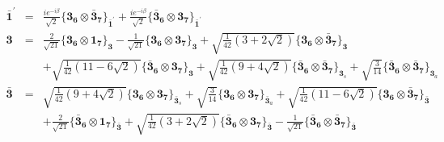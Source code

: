 \documentclass[english]{article}
\newcommand{\subcg}[3]{\big\{ {#1}\otimes{#2}\big\}^{}_{#3}}
\newcommand{\rep}[1]{\mathbf{#1}}
\begin{document}
\begin{itemize}
\begin{eqnarray*}
\\
\rep{\bar{1}^{\prime}} &=& \frac{i e^{-i \beta }}{\sqrt{2}}\subcg{\rep{3}_{\rep{6}}}{\rep{\bar{3}}_{\rep{7}}}{\rep{\bar{1}^{\prime}}}+\frac{i e^{-i \beta }}{\sqrt{2}}\subcg{\rep{\bar{3}}_{\rep{6}}}{\rep{3}_{\rep{7}}}{\rep{\bar{1}^{\prime}}}
\\
\rep{3} &=& \frac{2}{\sqrt{21}}\subcg{\rep{3}_{\rep{6}}}{\rep{1}_{\rep{7}}}{\rep{3}}-\frac{1}{\sqrt{21}}\subcg{\rep{3}_{\rep{6}}}{\rep{3}_{\rep{7}}}{\rep{3}}+\sqrt{\frac{1}{42} \left(3+2 \sqrt{2}\right)}\subcg{\rep{3}_{\rep{6}}}{\rep{\bar{3}}_{\rep{7}}}{\rep{3}} \\ 
 & & +\sqrt{\frac{1}{42} \left(11-6 \sqrt{2}\right)}\subcg{\rep{\bar{3}}_{\rep{6}}}{\rep{3}_{\rep{7}}}{\rep{3}}+\sqrt{\frac{1}{42} \left(9+4 \sqrt{2}\right)}\subcg{\rep{\bar{3}}_{\rep{6}}}{\rep{\bar{3}}_{\rep{7}}}{\rep{3}_{s}}+\sqrt{\frac{3}{14}}\subcg{\rep{\bar{3}}_{\rep{6}}}{\rep{\bar{3}}_{\rep{7}}}{\rep{3}_{a}}
\\
\rep{\bar{3}} &=& \sqrt{\frac{1}{42} \left(9+4 \sqrt{2}\right)}\subcg{\rep{3}_{\rep{6}}}{\rep{3}_{\rep{7}}}{\rep{\bar{3}}_{s}}+\sqrt{\frac{3}{14}}\subcg{\rep{3}_{\rep{6}}}{\rep{3}_{\rep{7}}}{\rep{\bar{3}}_{a}}+\sqrt{\frac{1}{42} \left(11-6 \sqrt{2}\right)}\subcg{\rep{3}_{\rep{6}}}{\rep{\bar{3}}_{\rep{7}}}{\rep{\bar{3}}} \\ 
 & & +\frac{2}{\sqrt{21}}\subcg{\rep{\bar{3}}_{\rep{6}}}{\rep{1}_{\rep{7}}}{\rep{\bar{3}}}+\sqrt{\frac{1}{42} \left(3+2 \sqrt{2}\right)}\subcg{\rep{\bar{3}}_{\rep{6}}}{\rep{3}_{\rep{7}}}{\rep{\bar{3}}}-\frac{1}{\sqrt{21}}\subcg{\rep{\bar{3}}_{\rep{6}}}{\rep{\bar{3}}_{\rep{7}}}{\rep{\bar{3}}}
\end{eqnarray*}
\end{itemize}
\end{document}
